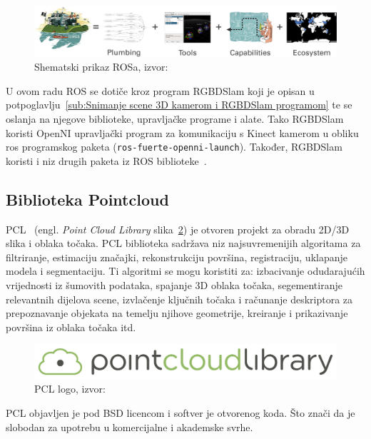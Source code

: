 \begin{figure}[h]
\centering
\includegraphics[scale=0.45]{figures/ros.png}
\caption[]{Shematski prikaz ROSa, izvor:~\cite{web:ros}}
\label{fig:ros.png}
\end{figure}

U ovom radu ROS se dotiče kroz program RGBDSlam koji je opisan u
potpoglavlju~\ref{sub:Snimanje scene 3D kamerom i RGBDSlam programom} te
se oslanja na njegove biblioteke, upravljačke programe i alate. Tako
RGBDSlam koristi OpenNI upravljački program za komunikaciju s Kinect
kamerom u obliku ros programskog paketa
(\texttt{ros-fuerte-openni-launch}). Također, RGBDSlam koristi i niz
drugih paketa iz ROS biblioteke~\cite{web:rgbdslam}.


\newpage
\subsection{Biblioteka Pointcloud} %
\label{sub:Biblioteka Pointcloud}

PCL~\cite{pcl} (engl. \textit{Point Cloud Library}
slika~\ref{fig:pcl.png}) je otvoren projekt za obradu 2D/3D slika i
oblaka točaka. PCL biblioteka sadržava niz najsuvremenijih algoritama za
filtriranje, estimaciju značajki, rekonstrukciju površina, registraciju,
uklapanje modela i segmentaciju.  Ti algoritmi se mogu koristiti za:
izbacivanje odudarajućih vrijednosti iz šumovith podataka, spajanje 3D
oblaka točaka, segementiranje relevantnih dijelova scene, izvlačenje
ključnih točaka i računanje deskriptora za prepoznavanje objekata na
temelju njihove geometrije, kreiranje i prikazivanje površina iz oblaka
točaka itd.

\begin{figure}[h]
\centering
\includegraphics[scale=0.15]{figures/pcl.png}
\caption{PCL logo, izvor:~\cite{web:pcl}}
\label{fig:pcl.png}
\end{figure}

PCL objavljen je pod BSD licencom i softver je otvorenog koda. Što znači
da je slobodan za upotrebu u komercijalne i akademske svrhe.

